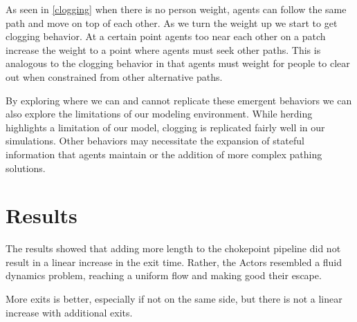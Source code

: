 \documentclass[12pt,letterpaper]{article}
\begin{document}
As seen in \ref{clogging} when there is no person weight, agents can follow the same path and move on top of each other.  As we turn the weight up we start to get clogging behavior.  At a certain point agents too near each other on a patch increase the weight to a point where agents must seek other paths.  This is analogous to the clogging behavior in that agents must weight for people to clear out when constrained from other alternative paths.

By exploring where we can and cannot replicate these emergent behaviors we can also explore the limitations of our modeling environment.  While herding highlights a limitation of our model, clogging is replicated fairly well in our simulations.  Other behaviors may necessitate the expansion of stateful information that agents maintain or the addition of more complex pathing solutions. 

\section{Results}

The results showed that adding more length to the chokepoint pipeline did not
result in a linear increase in the exit time. Rather, the Actors resembled a
fluid dynamics problem, reaching a uniform flow and making good their escape.

More exits is better, especially if not on the same side, but there is not a
linear increase with additional exits.
\end{document}
